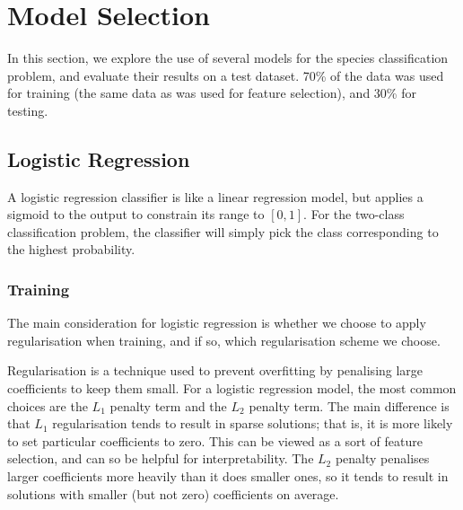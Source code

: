 % 

\section{Model Selection}

In this section, we explore the use of several models for the species classification problem, and evaluate their results on a test dataset. 70\% of the data was used for training (the same data as was used for feature selection), and 30\% for testing.

\subsection{Logistic Regression}

A logistic regression classifier is like a linear regression model, but applies a sigmoid to the output to constrain its range to $[0,1]$. For the two-class classification problem, the classifier will simply pick the class corresponding to the highest probability.

\subsubsection{Training}

The main consideration for logistic regression is whether we choose to apply regularisation when training, and if so, which regularisation scheme we choose.

Regularisation is a technique used to prevent overfitting by penalising large coefficients to keep them small. For a logistic regression model, the most common choices are the $L_1$ penalty term and the $L_2$ penalty term. The main difference is that $L_1$ regularisation tends to result in sparse solutions; that is, it is more likely to set particular coefficients to zero. This can be viewed as a sort of feature selection, and can so be helpful for interpretability. The $L_2$ penalty penalises larger coefficients more heavily than it does smaller ones, so it tends to result in solutions with smaller (but not zero) coefficients on average.

